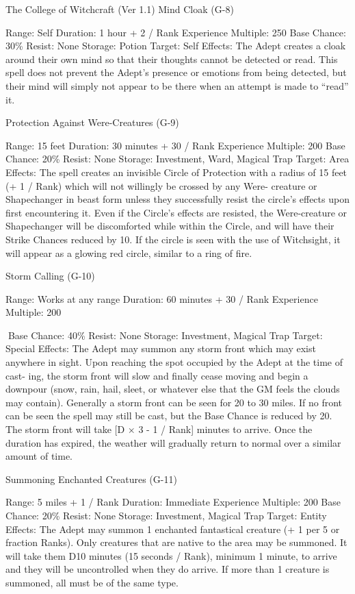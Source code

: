 \begin{Chapter}{The College of Witchcraft (Ver 1.1)}
Mind Cloak (G-8) 

Range: Self 
Duration: 1 hour + 2 / Rank 
Experience Multiple: 250 
Base Chance: 30\% 
Resist: None 
Storage: Potion 
Target: Self 
Effects:  The  Adept  creates  a  cloak  around  their 
own mind so that their thoughts cannot be detected 
or  read.  This  spell  does  not  prevent  the  Adept’s 
presence or emotions from being detected, but their 
mind  will  simply  not  appear  to  be  there  when  an 
attempt is made to “read” it. 

Protection Against Were-Creatures (G-9) 

Range: 15 feet 
Duration: 30 minutes + 30 / Rank 
Experience Multiple: 200 
Base Chance: 20\% 
Resist: None 
Storage: Investment, Ward, Magical Trap 
Target: Area 
Effects:  The  spell  creates  an  invisible  Circle  of 
Protection  with  a  radius  of  15  feet  (+  1  /  Rank) 
which  will  not  willingly  be  crossed  by  any  Were-
creature or Shapechanger in beast form unless they 
successfully  resist  the  circle’s  effects  upon  first 
encountering  it.  Even  if  the  Circle’s  effects  are 
resisted,  the  Were-creature  or  Shapechanger  will 
be  discomforted  while  within  the  Circle,  and  will 
have  their  Strike  Chances  reduced  by  10.  If  the 
circle  is  seen  with  the  use  of  Witchsight,  it  will 
appear as a glowing red circle, similar to a ring of 
fire. 

Storm Calling (G-10) 

Range: Works at any range 
Duration: 60 minutes + 30 / Rank 
Experience Multiple: 200 

Base Chance: 40\% 
Resist: None 
Storage: Investment, Magical Trap 
Target: Special 
Effects:  The  Adept  may  summon  any  storm  front 
which may exist anywhere in sight. Upon reaching 
the spot occupied by the Adept at the time of cast-
ing,  the  storm  front  will  slow  and  finally  cease 
moving  and  begin  a  downpour  (snow,  rain,  hail, 
sleet, or whatever else that the GM feels the clouds 
may  contain).  Generally  a  storm front  can be  seen 
for 20 to 30 miles. If no front can be seen the spell 
may  still  be  cast,  but  the  Base  Chance  is  reduced 
by 20. The storm front will take [D × 3 - 1 / Rank] 
minutes  to  arrive.  Once  the  duration  has  expired, 
the  weather  will  gradually  return to  normal  over  a 
similar amount of time. 

Summoning Enchanted Creatures (G-11) 

Range: 5 miles + 1 / Rank 
Duration: Immediate 
Experience Multiple: 200 
Base Chance: 20\% 
Resist: None 
Storage: Investment, Magical Trap 
Target: Entity 
Effects:  The  Adept  may  summon  1  enchanted 
fantastical  creature  (+  1  per  5  or  fraction  Ranks). 
Only  creatures  that  are  native  to  the  area  may  be 
summoned.  It  will  take  them  D10  minutes  (15 
seconds / Rank), minimum 1 minute, to arrive and 
they  will  be  uncontrolled  when  they  do  arrive.  If 
more  than  1  creature  is  summoned,  all  must  be  of 
the same type. 


\end{Chapter}
